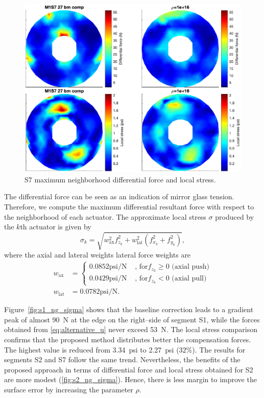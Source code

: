 \documentclass{gmto}
\begin{document}
\begin{figure}[!htb]
\centering
\includegraphics[width=\textwidth]{./pictures/s7_NG_sigma.eps}
\caption{\textsf{S7} maximum neighborhood differential force and local stress.}
\label{fig:s7_ng_sigma}
\end{figure}
The differential force can be seen as an indication of mirror glass tension. Therefore, we compute the maximum differential resultant force with respect to the  neighborhood of each actuator. The approximate local stress $\sigma$ produced by the $k$th actuator is given by \cite[Subsection~4.1.6]{gmtM1req}
\[\sigma_k = \sqrt{w_\text{ax}^2 f_{z_k}^2 + w_\text{lat}^2\left(f_{x_k}^2 + f_{y_k}^2\right)}, \]
%
where the axial and lateral weights lateral force weights are
\begin{align*}
    w_\text{ax} & = \left\{
    \begin{array}{ll}
         0.0852\text{psi/N} & \text{ , for} f_{z_k} \geq 0\text{ (axial push)}\\
         0.0429\text{psi/N} & \text{ , for} f_{z_k} < 0\text{ (axial pull)}
    \end{array}
    \right. \\
    w_\text{lat} & = 0.0782\text{psi/N}.
\end{align*}

Figure~\ref{fig:s1_ng_sigma} shows that the baseline correction leads to a gradient peak of almost \SI{90}{\newton} at the edge on the right--side of segment \textsf{S1}, while the forces obtained from \ref{eq:alternative_u} never exceed \SI{53}{\newton}. The local stress comparison confirms that the proposed method distributes better the compensation forces. The highest value is reduced from \SI{3.34}{psi} to \SI{2.27}{psi} ($32$\%). The results for segments \textsf{S2} and \textsf{S7} follow the same trend. Nevertheless, the benefits of the proposed approach in terms of differential force and local stress obtained for \textsf{S2} are more modest (\ref{fig:s2_ng_sigma}). Hence, there is less margin to improve the surface error by increasing the parameter $\rho$. %
\end{document}
